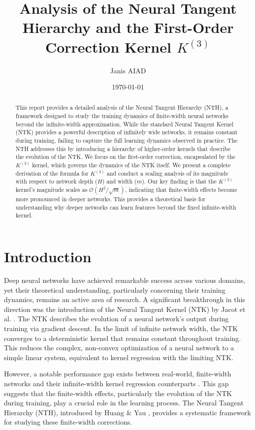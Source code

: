 \documentclass{article}
\title{Analysis of the Neural Tangent Hierarchy and the First-Order Correction Kernel $K^{(3)}$}
\author{Janis AIAD}
\date{\today}
\begin{document}
\maketitle

\begin{abstract}
This report provides a detailed analysis of the Neural Tangent Hierarchy (NTH), a framework designed to study the training dynamics of finite-width neural networks beyond the infinite-width approximation. While the standard Neural Tangent Kernel (NTK) provides a powerful description of infinitely wide networks, it remains constant during training, failing to capture the full learning dynamics observed in practice. The NTH addresses this by introducing a hierarchy of higher-order kernels that describe the evolution of the NTK. We focus on the first-order correction, encapsulated by the $K^{(3)}$ kernel, which governs the dynamics of the NTK itself. We present a complete derivation of the formula for $K^{(3)}$ and conduct a scaling analysis of its magnitude with respect to network depth ($H$) and width ($m$). Our key finding is that the $K^{(3)}$ kernel's magnitude scales as $\mathcal{O}(H^2/\sqrt{m})$, indicating that finite-width effects become more pronounced in deeper networks. This provides a theoretical basis for understanding why deeper networks can learn features beyond the fixed infinite-width kernel.
\end{abstract}

\tableofcontents
\newpage

\section{Introduction}

Deep neural networks have achieved remarkable success across various domains, yet their theoretical understanding, particularly concerning their training dynamics, remains an active area of research. A significant breakthrough in this direction was the introduction of the Neural Tangent Kernel (NTK) by Jacot et al. \cite{jacot2018neural}. The NTK describes the evolution of a neural network's output during training via gradient descent. In the limit of infinite network width, the NTK converges to a deterministic kernel that remains constant throughout training. This reduces the complex, non-convex optimization of a neural network to a simple linear system, equivalent to kernel regression with the limiting NTK.

However, a notable performance gap exists between real-world, finite-width networks and their infinite-width kernel regression counterparts \cite{arora2019exact}. This gap suggests that the finite-width effects, particularly the evolution of the NTK during training, play a crucial role in the learning process. The Neural Tangent Hierarchy (NTH), introduced by Huang \& Yau \cite{huang2019dynamics}, provides a systematic framework for studying these finite-width corrections.
\end{document}
